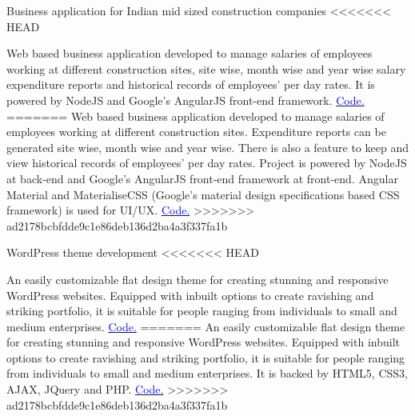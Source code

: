     {Business application for Indian mid sized construction companies}
    {}
    {}
    {}
<<<<<<< HEAD
    {Web based business application developed to manage salaries of employees working at different construction sites, site wise, month wise and year wise salary expenditure reports and historical records of employees' per day rates. It is powered by NodeJS and Google's AngularJS front-end framework.
        \hfill
        \href{https://bitbucket.org/harman052/gh/src/7388707bdb1138a6a4abc784bd5c6a4961a6d7f5/?at=new}{\textcolor{blue}{\scriptsize Code.}}
=======
    {Web based business application developed to manage salaries of employees working at different construction sites. Expenditure reports can be generated site wise, month wise and year wise. There is also a feature to keep and view historical records of employees' per day rates. Project is powered by NodeJS at back-end and Google's AngularJS front-end framework at front-end. Angular Material and MaterialiseCSS (Google's material design specifications based CSS framework) is used for UI/UX.
        \hfill
        \href{https://bitbucket.org/harman052/gh}{\textcolor{blue}{\scriptsize Code.}}
>>>>>>> ad2178bcbfdde9c1e86deb136d2ba4a3f337fa1b
    }
    \vspace*{0.2\baselineskip}


    {WordPress theme development}
    {}
    {}
    {}
<<<<<<< HEAD
    {An easily customizable flat design theme for creating stunning and responsive WordPress websites. Equipped with inbuilt options to create ravishing and striking portfolio, it is suitable for people ranging from individuals to small and medium enterprises. 
        \hfill
        \href{https://bitbucket.org/harman052/gh/src/7388707bdb1138a6a4abc784bd5c6a4961a6d7f5/?at=new}{\textcolor{blue}{\scriptsize Code.}}
=======
    {An easily customizable flat design theme for creating stunning and responsive WordPress websites. Equipped with inbuilt options to create ravishing and striking portfolio, it is suitable for people ranging from individuals to small and medium enterprises. It is backed by HTML5, CSS3, AJAX, JQuery and PHP.
        \hfill
        \href{https://bitbucket.org/harman052/csiom_theme}{\textcolor{blue}{\scriptsize Code.}}
>>>>>>> ad2178bcbfdde9c1e86deb136d2ba4a3f337fa1b
    }
    \vspace*{0.2\baselineskip}


}}

